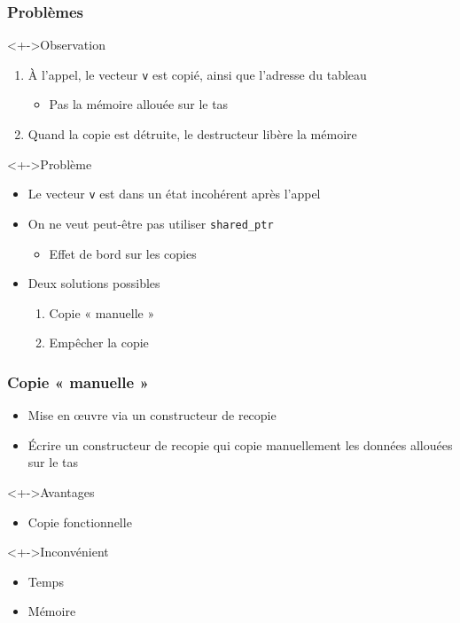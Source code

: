 \begin{frame}
\frametitle{Problèmes}
\begin{exampleblock}<+->{Observation}
	\begin{enumerate}[<+->]
	\item À l'appel, le vecteur \texttt{v} est copié, ainsi que l'adresse du tableau
		\begin{itemize}
		\item Pas la mémoire allouée sur le tas
		\end{itemize}	
	\item Quand la copie est détruite, le destructeur libère la mémoire
	\end{enumerate}
\end{exampleblock}
\begin{alertblock}<+->{Problème}
	\begin{itemize}[<+->]
	\item Le vecteur \texttt{v} est dans un état incohérent après l'appel
	\end{itemize}
\end{alertblock}
\begin{itemize}[<+->]
\item On ne veut peut-être pas utiliser \lstinline|shared_ptr|
	\begin{itemize}
	\item Effet de bord sur les copies
	\end{itemize}
\item Deux solutions possibles
	\begin{enumerate}
	\item Copie « manuelle »
	\item Empêcher la copie
	\end{enumerate}
\end{itemize}
\end{frame}

\begin{frame}
\frametitle{Copie « manuelle »}
\begin{itemize}[<+->]
\item Mise en œuvre via un constructeur de recopie
\item Écrire un constructeur de recopie qui copie manuellement les données allouées sur le tas
\end{itemize}
\begin{exampleblock}<+->{Avantages}
	\begin{itemize}[<+->]
	\item Copie fonctionnelle
	\end{itemize}
\end{exampleblock}
\begin{alertblock}<+->{Inconvénient}
	\begin{itemize}[<+->]
	\item Temps
	\item Mémoire
	\end{itemize}
\end{alertblock}
\end{frame}

